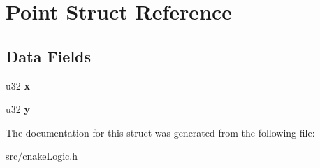 \hypertarget{struct_point}{}\section{Point Struct Reference}
\label{struct_point}
\subsection*{Data Fields}
\begin{DoxyCompactItemize}
\item 
u32 {\bfseries x}\hypertarget{struct_point_af80df1bdae91e5f76236e6ed1110825d}{}\label{struct_point_af80df1bdae91e5f76236e6ed1110825d}

\item 
u32 {\bfseries y}\hypertarget{struct_point_a11e444dd61d48abbdd34eed23186cb4b}{}\label{struct_point_a11e444dd61d48abbdd34eed23186cb4b}

\end{DoxyCompactItemize}


The documentation for this struct was generated from the following file\+:\begin{DoxyCompactItemize}
\item 
src/cnake\+Logic.\+h\end{DoxyCompactItemize}
